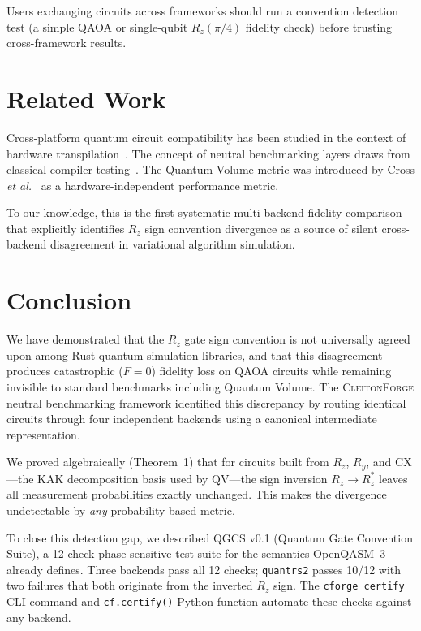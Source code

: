 \documentclass[11pt,a4paper]{article}
\begin{document}
Users exchanging circuits across frameworks should run a convention detection
test (a simple QAOA or single-qubit $R_z(\pi/4)$ fidelity check) before trusting
cross-framework results.

\section{Related Work}

Cross-platform quantum circuit compatibility has been studied in the context of
hardware transpilation~\cite{qiskit2023}. The concept of neutral benchmarking
layers draws from classical compiler testing~\cite{yang2011finding}. The Quantum
Volume metric was introduced by Cross \emph{et al.}~\cite{cross2019validating}
as a hardware-independent performance metric.

To our knowledge, this is the first systematic multi-backend fidelity comparison
that explicitly identifies $R_z$ sign convention divergence as a source of
silent cross-backend disagreement in variational algorithm simulation.

\section{Conclusion}

We have demonstrated that the $R_z$ gate sign convention is not universally
agreed upon among Rust quantum simulation libraries, and that this disagreement
produces catastrophic ($F=0$) fidelity loss on QAOA circuits while remaining
invisible to standard benchmarks including Quantum Volume. The \textsc{CleitonForge}
neutral benchmarking framework identified this discrepancy by routing identical
circuits through four independent backends using a canonical intermediate
representation.

We proved algebraically (Theorem~1) that for circuits built from $R_z$, $R_y$,
and $\mathrm{CX}$---the KAK decomposition basis used by QV---the sign inversion
$R_z \to R_z^*$ leaves all measurement probabilities exactly unchanged.
This makes the divergence undetectable by \emph{any} probability-based metric.

To close this detection gap, we described QGCS v0.1 (Quantum Gate Convention
Suite), a 12-check phase-sensitive test suite for the semantics OpenQASM~3
already defines. Three backends pass all 12 checks; \texttt{quantrs2} passes
10/12 with two failures that both originate from the inverted $R_z$ sign. The
\texttt{cforge certify} CLI command and \texttt{cf.certify()} Python function
automate these checks against any backend.
\end{document}
